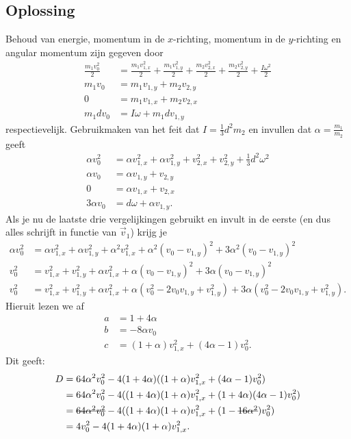\documentclass[a4paper,11pt]{article}
\newcommand{\stkout}[1]{\ifmmode\text{\sout{\ensuremath{#1}}}\else\sout{#1}\fi}
\begin{document}
\subsection*{Oplossing}
Behoud van energie, momentum in de $x$-richting, momentum in de $y$-richting en angular momentum zijn gegeven door
\begin{align}
	\frac{m_1 v_0^2}{2}&=\frac{m_1v_{1,x}^2}{2}+\frac{m_1v_{1,y}^2}{2}+\frac{m_2v_{2,x}^2}{2}+\frac{m_2v_{2,y}^2}{2}+\frac{I\omega^2}{2}\\
	m_1v_0&=m_1v_{1,y}+m_2v_{2,y}\\
	0&=m_1v_{1,x}+m_2v_{2,x}\\
	m_1dv_0&=I\omega+m_1dv_{1,y}
\end{align}
respectievelijk. Gebruikmaken van het feit dat $I=\frac{1}{3}d^2m_2$ en invullen dat $\alpha=\frac{m_1}{m_2}$ geeft
\begin{align}
	\alpha v_0^2&=\alpha v_{1,x}^2+\alpha v_{1,y}^2+v_{2,x}^2+v_{2,y}^2+\frac{1}{3}d^2\omega^2\\
	\alpha v_0&=\alpha v_{1,y}+v_{2,y}\\
	0&=\alpha v_{1,x}+v_{2,x}\\
	3\alpha v_0&=d\omega+\alpha v_{1,y}.
\end{align}
Als je nu de laatste drie vergelijkingen gebruikt en invult in de eerste (en dus alles schrijft in functie van $\vec{v}_1$) krijg je
\begin{align}
	\alpha v_0^2&=\alpha v_{1,x}^2+\alpha v_{1,y}^2+\alpha^2 v_{1,x}^2+\alpha^2(v_0-v_{1,y})^2+3\alpha^2(v_0-v_{1,y})^2\\
	v_0^2&=v_{1,x}^2+v_{1,y}^2+\alpha v_{1,x}^2+\alpha(v_0-v_{1,y})^2+3\alpha(v_0-v_{1,y})^2\\
	v_0^2&=v_{1,x}^2+v_{1,y}^2+\alpha v_{1,x}^2+\alpha(v_0^2-2v_0v_{1,y}+v_{1,y}^2)+3\alpha(v_0^2-2v_0v_{1,y}+v_{1,y}^2).
\end{align}
Hieruit lezen we af
\begin{align}
	a&=1+4\alpha \\ b&=-8\alpha v_0 \\ c&=(1+\alpha)v_{1,x}^2+(4\alpha-1)v_0^2.
\end{align}
Dit geeft:
\begin{align}
	D&=64\alpha^2v_0^2-4(1+4\alpha)((1+\alpha)v_{1,x}^2+(4\alpha-1)v_0^2)\\
	&=64\alpha^2v_0^2-4((1+4\alpha)(1+\alpha)v_{1,x}^2+(1+4\alpha)(4\alpha-1)v_0^2)\\
	&=\stkout{64\alpha^2v_0^2}-4((1+4\alpha)(1+\alpha)v_{1,x}^2+(1-\stkout{16\alpha^2})v_0^2)\\
	&=4v_0^2-4(1+4\alpha)(1+\alpha)v_{1,x}^2.
\end{align}
\end{document}
